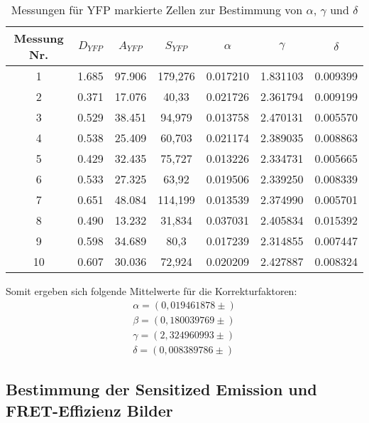 \begin{table}[h]
    \centering
    \begin{tabular}{c|c|c|c|c|c|c}
         Messung Nr. &  $D_{YFP}$ & $A_{YFP}$ & $S_{YFP}$ &     $\alpha$ &     $\gamma$ &     $\delta$ \\\hline\hline
               1 &  1.685 &  97.906 &     179,276 &  0.017210 &  1.831103 &  0.009399 \\\hline
               2 &  0.371 &  17.076 &       40,33 &  0.021726 &  2.361794 &  0.009199 \\\hline
               3 &  0.529 &  38.451 &      94,979 &  0.013758 &  2.470131 &  0.005570 \\\hline
               4 &  0.538 &  25.409 &      60,703 &  0.021174 &  2.389035 &  0.008863 \\\hline
               5 &  0.429 &  32.435 &      75,727 &  0.013226 &  2.334731 &  0.005665 \\\hline
               6 &  0.533 &  27.325 &       63,92 &  0.019506 &  2.339250 &  0.008339 \\\hline
               7 &  0.651 &  48.084 &     114,199 &  0.013539 &  2.374990 &  0.005701 \\\hline
               8 &  0.490 &  13.232 &      31,834 &  0.037031 &  2.405834 &  0.015392 \\\hline
               9 &  0.598 &  34.689 &        80,3 &  0.017239 &  2.314855 &  0.007447 \\\hline
              10 &  0.607 &  30.036 &      72,924 &  0.020209 &  2.427887 &  0.008324 \\\hline
        \end{tabular}
    \caption{Messungen für YFP markierte Zellen zur Bestimmung von $\alpha$, $\gamma$ und $\delta$}
\end{table}

Somit ergeben sich folgende Mittelwerte für die Korrekturfaktoren: 
\begin{align}
    \alpha = (0,019461878 \pm )\\
    \beta = (0,180039769 \pm )\\
    \gamma = (2,324960993 \pm )\\
    \delta = (0,008389786 \pm )
\end{align}

\newpage
\subsection{Bestimmung der Sensitized Emission und FRET-Effizienz Bilder}

